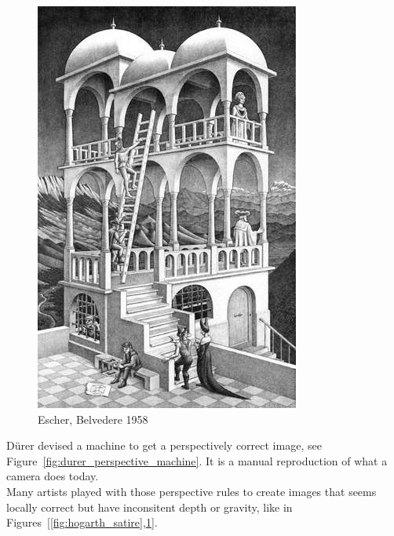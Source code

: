 \begin{figure}[h]
\centering
\includegraphics[width=\columnwidth]{img/escher_belvedere.jpg}
\caption{Escher, Belvedere 1958}%
\label{fig:escher_belvedere}
\end{figure}

D\"urer devised a machine to get a perspectively correct image,
see Figure~\ref{fig:durer_perspective_machine}.
It is a manual reproduction of what a camera does today.\\

Many artists played with those perspective rules to create images
that seems locally correct but have inconsitent depth or gravity, like
in Figures~[\ref{fig:hogarth_satire},\ref{fig:escher_belvedere}].



